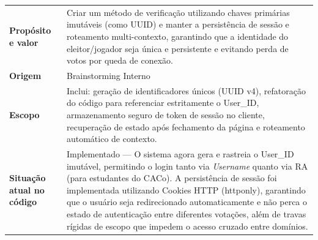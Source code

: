\documentclass[12pt,a4paper]{article}
\begin{document}
\renewcommand{\arraystretch}{1.5}
\begin{table}[H]
    \centering
    \begin{tabular}{|m{4.5cm} | m{11cm}|}
    \hline
    
    \textbf{Propósito e valor} &
    Criar um método de verificação utilizando chaves primárias imutáveis (como UUID) e manter a persistência de sessão e roteamento multi-contexto, garantindo que a identidade do eleitor/jogador seja única e persistente e evitando perda de votos por queda de conexão. \\
    
    \textbf{Origem} & Brainstorming Interno \\
    
    \textbf{Escopo} &
    Inclui: geração de identificadores únicos (UUID v4), refatoração do código para referenciar estritamente o User\_ID, armazenamento seguro de token de sessão no cliente, recuperação de estado após fechamento da página e roteamento automático de contexto. \\
    
    \textbf{Situação atual no código} &
    Implementado --- O sistema agora gera e rastreia o User\_ID imutável, permitindo o login tanto via \textit{Username} quanto via RA (para estudantes do CACo). A persistência de sessão foi implementada utilizando Cookies HTTP (httponly), garantindo que o usuário seja redirecionado automaticamente e não perca o estado de autenticação entre diferentes votações, além de travas rígidas de escopo que impedem o acesso cruzado entre domínios. \\
    
    \hline
    \end{tabular}
\end{table}

\vspace{0.5cm}
\end{document}
